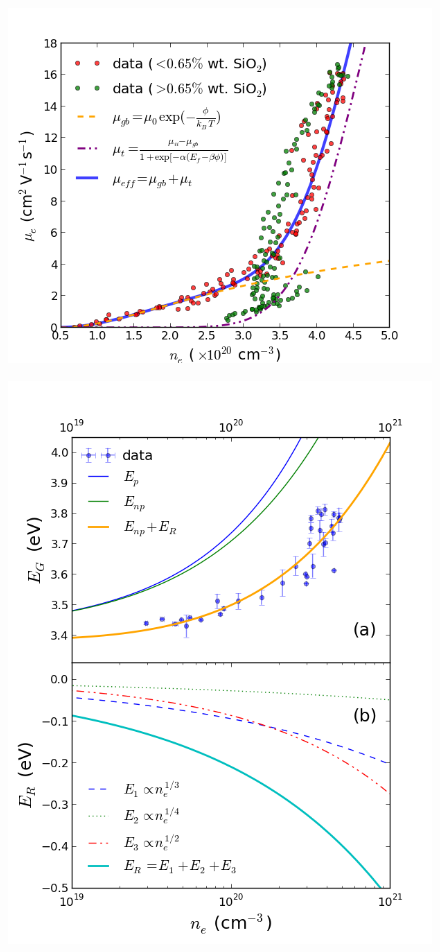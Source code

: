 \documentclass[aps,prl,5p,showpacs,showkeys,twocolumn]{revtex4-1}
\begin{document}
\begin{figure}[p]
\includegraphics[width=1\columnwidth]{figure4.png}
\caption{\label{fig:6} }
\end{figure}

\begin{figure}[p]
\includegraphics[width = \columnwidth]{figure5.png}
\caption{\label{fig:7}}
\end{figure}
\end{document}
